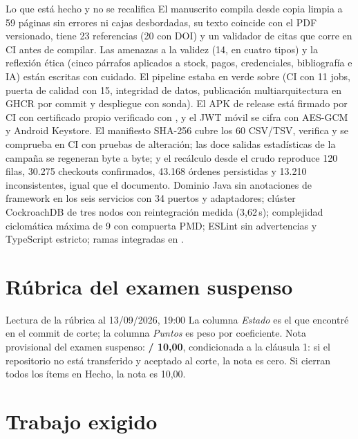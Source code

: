 \begin{logro}{Lo que est\'a hecho y no se recalifica}
El manuscrito compila desde copia limpia a 59 p\'aginas sin errores ni cajas desbordadas, su texto coincide con el PDF versionado, tiene 23 referencias (20 con DOI) y un validador de citas que corre en CI antes de compilar. Las amenazas a la validez (14, en cuatro tipos) y la reflexi\'on \'etica (cinco p\'arrafos aplicados a stock, pagos, credenciales, bibliograf\'ia e IA) est\'an escritas con cuidado. El pipeline estaba en verde sobre  (CI con 11 jobs, puerta de calidad con 15, integridad de datos, publicaci\'on multiarquitectura en GHCR por commit y despliegue con sonda). El APK de release est\'a firmado por CI con certificado propio verificado con , y el JWT m\'ovil se cifra con AES-GCM y Android Keystore. El manifiesto SHA-256 cubre los 60 CSV/TSV, verifica y se comprueba en CI con pruebas de alteraci\'on; las doce salidas estad\'isticas de la campa\~na se regeneran byte a byte; y el rec\'alculo desde el crudo reproduce 120 filas, 30.275 checkouts confirmados, 43.168 \'ordenes persistidas y 13.210 inconsistentes, igual que el documento. Dominio Java sin anotaciones de framework en los seis servicios con 34 puertos y adaptadores; cl\'uster CockroachDB de tres nodos con reintegraci\'on medida (3,62\,s); complejidad ciclom\'atica m\'axima de 9 con compuerta PMD; ESLint sin advertencias y TypeScript estricto; ramas integradas en .
\end{logro}

\section{R\'ubrica del examen suspenso}

\reglarubrica



\begin{nota}{Lectura de la r\'ubrica al 13/09/2026, 19:00}
La columna \emph{Estado} es el que encontr\'e en el commit de corte; la columna \emph{Puntos} es peso por coeficiente. Nota provisional del examen suspenso: \textbf{\notaprov{} / 10,00}, condicionada a la cl\'ausula 1: si el repositorio no est\'a transferido y aceptado al corte, la nota es cero. Si cierran todos los \'items en Hecho, la nota es 10,00.
\end{nota}

\section{Trabajo exigido}

